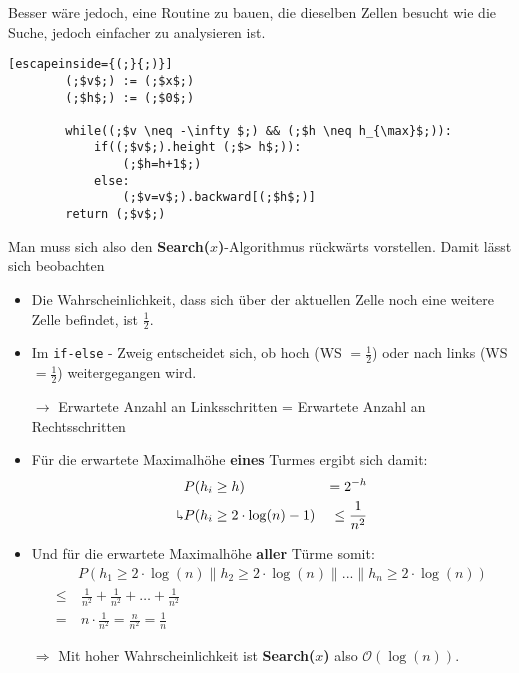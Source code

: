\documentclass{scrartcl}%
\begin{document}
    Besser wäre jedoch, eine Routine zu bauen, die dieselben Zellen besucht wie die Suche, jedoch einfacher zu analysieren ist.
    \begin{lstlisting}[escapeinside={(;}{;)}]
        (;$v$;) := (;$x$;)
        (;$h$;) := (;$0$;)

        while((;$v \neq -\infty $;) && (;$h \neq h_{\max}$;)):
            if((;$v$;).height (;$> h$;)):
                (;$h=h+1$;)
            else:
                (;$v=v$;).backward[(;$h$;)]
        return (;$v$;)
    \end{lstlisting}

    Man muss sich also den \textbf{\textsf{Search($x$)}}-Algorithmus rückwärts vorstellen.
    Damit lässt sich beobachten

    \begin{itemize}
        \item Die Wahrscheinlichkeit, dass sich über der aktuellen Zelle noch eine weitere Zelle befindet, ist $\frac{1}{2}$.
        \item Im \texttt{if-else} - Zweig entscheidet sich, ob hoch (WS $=\frac{1}{2}$) oder nach links (WS $=\frac{1}{2}$) weitergegangen wird.
        \item [$\rightarrow$] Erwartete Anzahl an Linksschritten = Erwartete Anzahl an Rechtsschritten
        \item Für die erwartete Maximalhöhe \textbf{\textsf{eines}} Turmes ergibt sich damit:
        \begin{equation*}
            \begin{flalign}
                & P(h_i \geq h) &= 2^{-h} \\\nonumber
                \rotatebox[origin=c]{180}{$\Lsh$} & P(h_i \geq 2 \cdot \log(n) - 1) &\leq \frac{1}{n^2}
            \end{flalign}
        \end{equation*}
        \item Und für die erwartete Maximalhöhe \textbf{\textsf{aller}} Türme somit:
        \begin{equation*}
            \begin{flalign}
                & P(h_1 \geq 2 \cdot \log(n) \| h_2 \geq 2 \cdot \log(n) \| ... \| h_n \geq 2 \cdot \log(n))\\\nonumber
                \leq &\  \frac{1}{n^2} + \frac{1}{n^2} + \ldots + \frac{1}{n^2}\\\nonumber
                = &\  n\cdot \frac{1}{n^2} = \frac{n}{n^2} = \frac{1}{n}
            \end{flalign}
        \end{equation*}
        \item [$\Rightarrow$] Mit hoher Wahrscheinlichkeit ist \textbf{\textsf{Search($x$)}} also $\mathcal{O}(\log(n))$.
    \end{itemize}
\end{document}
